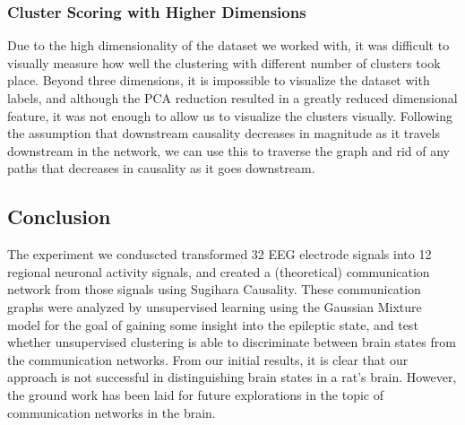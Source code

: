 \subsubsection{Cluster Scoring with Higher Dimensions}
Due to the high dimensionality of the dataset we worked with, it was difficult to visually measure how well the clustering with different number of clusters took place. Beyond three dimensions, it is impossible to visualize the dataset with labels, and although the PCA reduction resulted in a greatly reduced dimensional feature, it was not enough to allow us to visualize the clusters visually.
Following the assumption that downstream causality decreases in magnitude as it travels downstream in the network, we can use this to traverse the graph and rid of any paths that decreases in causality as it goes downstream.

\subsection{Conclusion}
The experiment we conduscted transformed 32 EEG electrode signals into 12 regional neuronal activity signals, and created a (theoretical) communication network from those signals using Sugihara Causality. These communication graphs were analyzed by unsupervised learning using the Gaussian Mixture model for the goal of gaining some insight into the epileptic state, and test whether unsupervised clustering is able to discriminate between brain states from the communication networks. From our initial results, it is clear that our approach is not successful in distinguishing brain states in a rat's brain. However, the ground work has been laid for future explorations in the topic of communication networks in the brain. 
